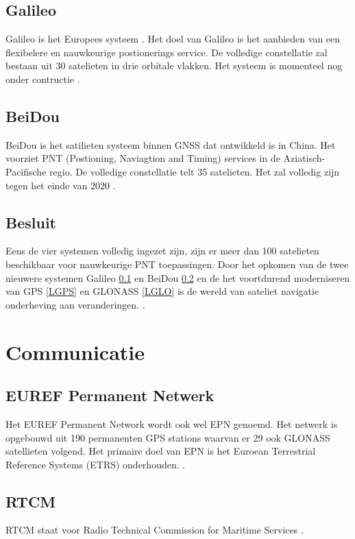 \subsection{Galileo}
\label{LGal}
Galileo is het Europees systeem \cite{LBibGNSS3}\cite{LBibGNSS4}. Het doel van Galileo is het aanbieden van een flexibelere en nauwkeurige postionerings service. De volledige constellatie zal bestaan uit 30 satelieten in drie orbitale vlakken. Het systeem is momenteel nog onder contructie \cite{LBibGNSS4}.

\subsection{BeiDou}
\label{LBeD}
BeiDou is het satilieten systeem binnen GNSS dat ontwikkeld is in China. Het voorziet PNT (Postioning, Naviagtion and Timing) services in de Aziatisch-Pacifische regio. De volledige constellatie telt 35 satelieten. Het zal volledig zijn tegen het einde van 2020 \cite{LBibGNSS4}.

\subsection{Besluit}
Eens de vier systemen volledig ingezet zijn, zijn er meer dan 100 satelieten beschikbaar voor nauwkeurige PNT toepassingen. Door het opkomen van de twee nieuwere systemen Galileo \ref{LGal} en BeiDou \ref{LBeD} en de het voortdurend moderniseren van GPS \ref{LGPS} en GLONASS \ref{LGLO} is de wereld van sateliet navigatie onderheving aan veranderingen. \cite{LBibGNSS4}.

\section{Communicatie}
\label{LCom}
\subsection{EUREF Permanent Netwerk}
Het EUREF Permanent Network wordt ook wel EPN genoemd. Het netwerk is opgebouwd uit 190 permanenten GPS stations waarvan er 29 ook GLONASS satellieten volgend. Het primaire doel van EPN is het Euroean Terrestrial Reference Systems (ETRS) onderhouden. \cite{LBibEPN}.

\subsection{RTCM}
RTCM staat voor Radio Technical Commission for Maritime Services \cite{LBibGLONASS}.

